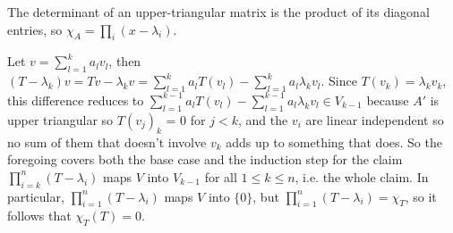 \documentclass[11pt, oneside]{article}   	%
\begin{document}
\item The determinant of an upper-triangular matrix is the product of its diagonal entries, so $\chi_A = \prod_i(x-\lambda_i)$.
\item Let $v = \sum_{l=1}^ka_lv_l$, then $(T-\lambda_k)v = Tv - \lambda_kv = \sum_{l=1}^ka_lT(v_l) - \sum_{l=1}^ka_l\lambda_kv_l$. Since $T(v_k) = \lambda_kv_k$, this difference reduces to $\sum_{l=1}^{k-1}a_lT(v_l) - \sum_{l=1}^{k-1}a_l\lambda_kv_l \in V_{k-1}$ because $A'$ is upper triangular so $T(v_j)_k$ = 0 for $j < k$, and the $v_i$ are linear independent so no sum of them that doesn't involve $v_k$ adds up to something that does. So the foregoing covers both the base case and the induction step for the claim $\prod_{i=k}^n(T-\lambda_i)$ maps $V$ into $V_{k-1}$ for all $1 \le k \le n$, i.e. the whole claim. In particular, $\prod_{i=1}^n(T-\lambda_i)$ maps $V$ into $\{0\}$, but $\prod_{i=1}^n(T-\lambda_i) = \chi_T$, so it follows that $\chi_T(T) = 0$.
\ee
\end{document}
